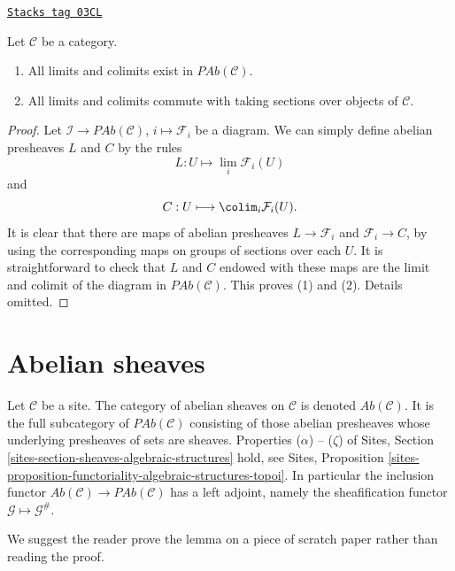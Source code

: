 \begin{lemma}
\label{sites-modules-lemma-limits-colimits-abelian-presheaves}
\href{https://stacks.math.columbia.edu/tag/03CL}{\texttt{Stacks tag 03CL}}

Let $\mathcal{C}$ be a category.
\begin{enumerate}
\item All limits and colimits exist in $\textit{PAb}(\mathcal{C})$.
\item All limits and colimits commute with taking sections over objects of
$\mathcal{C}$.
\end{enumerate}
\end{lemma}

\begin{proof}
Let $\mathcal{I} \to \textit{PAb}(\mathcal{C})$, $i \mapsto \mathcal{F}_i$
be a diagram. We can simply define abelian presheaves
$L$ and $C$ by the rules
$$
L : U \longmapsto \lim_i \mathcal{F}_i(U)
$$
and
$$
C : U \longmapsto \colim_i \mathcal{F}_i(U).
$$
It is clear that there are maps of abelian presheaves $L \to \mathcal{F}_i$
and $\mathcal{F}_i \to C$, by using the corresponding maps on groups of
sections over each $U$. It is straightforward to check that $L$ and $C$ endowed
with these maps are the limit and colimit of the diagram in
$\textit{PAb}(\mathcal{C})$. This proves (1) and (2). Details omitted.
\end{proof}

\section{Abelian sheaves}
\label{sites-modules-section-abelian-sheaves}
Let $\mathcal{C}$ be a site.
The category of abelian sheaves on $\mathcal{C}$ is denoted
$\textit{Ab}(\mathcal{C})$. It is the full subcategory of
$\textit{PAb}(\mathcal{C})$ consisting of those abelian presheaves
whose underlying presheaves of sets are sheaves.
Properties ($\alpha$) -- ($\zeta$) of
Sites, Section \ref{sites-section-sheaves-algebraic-structures}
hold, see
Sites,
Proposition \ref{sites-proposition-functoriality-algebraic-structures-topoi}.
In particular the inclusion functor
$\textit{Ab}(\mathcal{C}) \to \textit{PAb}(\mathcal{C})$
has a left adjoint, namely the sheafification functor
$\mathcal{G} \mapsto \mathcal{G}^\#$.

\medskip\noindent
We suggest the reader prove the lemma on a piece of scratch paper rather
than reading the proof.

